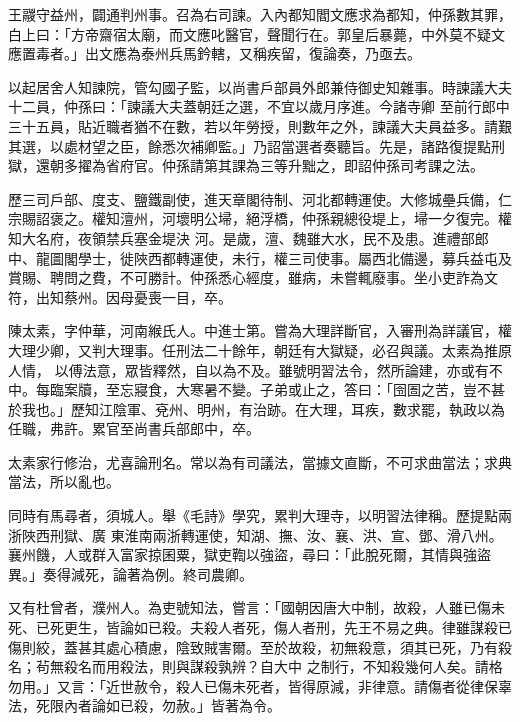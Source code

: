 \begin{pinyinscope}
 王鬷守益州，闢通判州事。召為右司諫。入內都知閻文應求為都知，仲孫數其罪，白上曰：「方帝齋宿太廟，而文應叱醫官，聲聞行在。郭皇后暴薨，中外莫不疑文應置毒者。」出文應為泰州兵馬鈐轄，又稱疾留，復論奏，乃亟去。



 以起居舍人知諫院，管勾國子監，以尚書戶部員外郎兼侍御史知雜事。時諫議大夫十二員，仲孫曰：「諫議大夫蓋朝廷之選，不宜以歲月序進。今諸寺卿
 至前行郎中三十五員，貼近職者猶不在數，若以年勞授，則數年之外，諫議大夫員益多。請艱其選，以處材望之臣，餘悉次補卿監。」乃詔當選者奏聽旨。先是，諸路復提點刑獄，還朝多擢為省府官。仲孫請第其課為三等升黜之，即詔仲孫司考課之法。



 歷三司戶部、度支、鹽鐵副使，進天章閣待制、河北都轉運使。大修城壘兵備，仁宗賜詔褒之。權知澶州，河壞明公埽，絕浮橋，仲孫親總役堤上，埽一夕復完。權知大名府，夜領禁兵塞金堤決
 河。是歲，澶、魏雖大水，民不及患。進禮部郎中、龍圖閣學士，徙陜西都轉運使，未行，權三司使事。屬西北備邊，募兵益屯及賞賜、聘問之費，不可勝計。仲孫悉心經度，雖病，未嘗輒廢事。坐小吏詐為文符，出知蔡州。因母憂喪一目，卒。



 陳太素，字仲華，河南緱氏人。中進士第。嘗為大理詳斷官，入審刑為詳議官，權大理少卿，又判大理事。任刑法二十餘年，朝廷有大獄疑，必召與議。太素為推原人情，
 以傅法意，眾皆釋然，自以為不及。雖號明習法令，然所論建，亦或有不中。每臨案牘，至忘寢食，大寒暑不變。子弟或止之，答曰：「囹圄之苦，豈不甚於我也。」歷知江陰軍、兗州、明州，有治跡。在大理，耳疾，數求罷，執政以為任職，弗許。累官至尚書兵部郎中，卒。



 太素家行修治，尤喜論刑名。常以為有司議法，當據文直斷，不可求曲當法；求典當法，所以亂也。



 同時有馬尋者，須城人。舉《毛詩》學究，累判大理寺，以明習法律稱。歷提點兩浙陜西刑獄、廣
 東淮南兩浙轉運使，知湖、撫、汝、襄、洪、宣、鄧、滑八州。襄州饑，人或群入富家掠囷粟，獄吏鞫以強盜，尋曰：「此脫死爾，其情與強盜異。」奏得減死，論著為例。終司農卿。



 又有杜曾者，濮州人。為吏號知法，嘗言：「國朝因唐大中制，故殺，人雖已傷未死、已死更生，皆論如已殺。夫殺人者死，傷人者刑，先王不易之典。律雖謀殺已傷則絞，蓋甚其處心積慮，陰致賊害爾。至於故殺，初無殺意，須其已死，乃有殺名；茍無殺名而用殺法，則與謀殺孰辨？自大中
 之制行，不知殺幾何人矣。請格勿用。」又言：「近世赦令，殺人已傷未死者，皆得原減，非律意。請傷者從律保辜法，死限內者論如已殺，勿赦。」皆著為令。




\end{pinyinscope}
